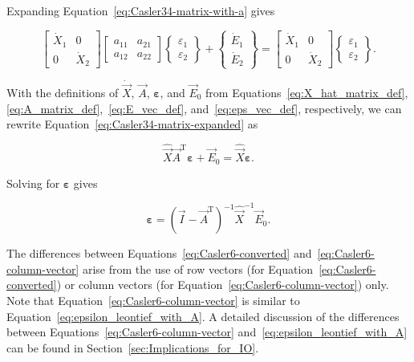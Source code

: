\noindent{}Expanding Equation~\ref{eq:Casler34-matrix-with-a} gives

\begin{equation} \label{eq:Casler34-matrix-expanded}
	\begin{bmatrix}
		\dot{X}_{1} & 0 \\
		0           & \dot{X}_{2}
	\end{bmatrix}
	\begin{bmatrix}
		a_{11} & a_{21} \\
		a_{12} & a_{22}
	\end{bmatrix}
	\begin{Bmatrix}
		\varepsilon_{1} \\
		\varepsilon_{2}
	\end{Bmatrix}
	+
	\begin{Bmatrix}
		\dot{E}_{1} \\
		\dot{E}_{2}
	\end{Bmatrix}
	=
	\begin{bmatrix}
		\dot{X}_{1} & 0 \\
		0           & \dot{X}_{2}
	\end{bmatrix}
	\begin{Bmatrix}
		\varepsilon_{1} \\
		\varepsilon_{2}
	\end{Bmatrix}.
\end{equation}

\noindent{}With the definitions of $\dot{\vec{X}}$,
$\vec{A}$, $\bm{\varepsilon}$, and $\vec{E}_{0}$
from Equations~\ref{eq:X_hat_matrix_def},
\ref{eq:A_matrix_def},~\ref{eq:E_vec_def}, 
and~\ref{eq:eps_vec_def}, respectively,
we can rewrite Equation~\ref{eq:Casler34-matrix-expanded} as

\begin{equation}
	\hat{\vec{X}} \vec{A}^{\mathrm{T}} \bm{\varepsilon}
	+ \vec{E}_{0}
	= \hat{\vec{X}} \bm{\varepsilon}.
\end{equation}

\noindent{}Solving for $\bm{\varepsilon}$ gives

\begin{equation} \label{eq:Casler6-column-vector}
	\bm{\varepsilon}
	= {(\vec{I} - \vec{A}^{\mathrm{T}})}^{-1} 
		\hat{\vec{X}}^{-1} 
		\vec{E}_{0}.
\end{equation}

The differences between Equations~\ref{eq:Casler6-converted}
and~\ref{eq:Casler6-column-vector} arise from the use 
of row vectors (for Equation~\ref{eq:Casler6-converted})
or column vectors (for Equation~\ref{eq:Casler6-column-vector}) only.
Note that Equation~\ref{eq:Casler6-column-vector} is similar
to Equation~\ref{eq:epsilon_leontief_with_A}.
A detailed discussion of the differences 
between Equations~\ref{eq:Casler6-column-vector} and~\ref{eq:epsilon_leontief_with_A}
can be found in Section~\ref{sec:Implications_for_IO}.


